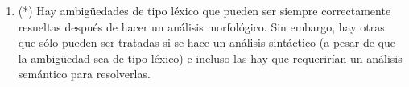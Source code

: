 \begin{enumerate}
\begin{enumerate}
\end{enumerate} 

\item (*) Hay ambigüedades de tipo léxico que pueden ser siempre correctamente resueltas después de hacer un análisis morfológico. Sin embargo, hay otras que sólo pueden ser tratadas si se hace un análisis sintáctico (a pesar de que la ambigüedad sea de tipo léxico) e incluso las hay que requerirían un análisis semántico para resolverlas. 


\end{enumerate}
